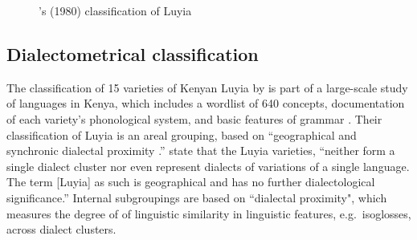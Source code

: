 \documentclass[output=paper]{langscibook}
\begin{document}
\begin{figure}
  \centering
   
  \caption{\citeauthor{nurse_bantu_1980}’s (1980) classification of Luyia}
  \label{fig:6:NursePhilippson1980}
\end{figure}


\subsection{Dialectometrical classification \citep{heine_language_1980}}
\label{sec:2.3:Dialectometrical_classification}

The classification of 15 varieties of Kenyan Luyia by \citet{heine_language_1980} is part of a large-scale study of languages in Kenya, which includes a wordlist of 640 concepts, documentation of each variety's phonological system, and basic features of grammar \citep[9]{heine_language_1980}. Their classification of Luyia is an areal grouping, based on ``geographical and synchronic dialectal proximity \citep[13]{heine_language_1980}.'' \citet[32]{heine_language_1980} state that the Luyia varieties, ``neither form a single dialect cluster nor even represent dialects of variations of a single language. The term [Luyia] as such is geographical and has no further dialectological significance.” Internal subgroupings are based on ``dialectal proximity", which measures the degree of of linguistic similarity in linguistic features, e.g.\ isoglosses, across dialect clusters.
\end{document}
